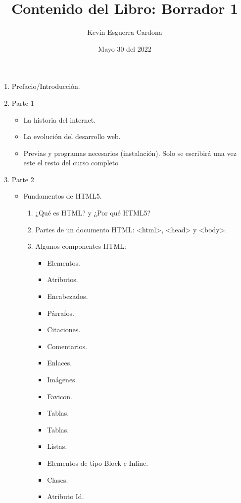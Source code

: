 \documentclass[12pt, letterpaper]{article}
\title{Contenido del Libro: Borrador 1}
\author{Kevin  Esguerra Cardona}
\date{Mayo 30 del 2022}
\begin{document}
\maketitle

\begin{enumerate}
    \item Prefacio/Introducción.
    \item Parte 1
    \begin{itemize}
        \item La historia del internet.
        \item La evolución del desarrollo web.
        \item Previas y programas necesarios (instalación). \newline*Solo se escribirá  una vez este el resto del curso completo
    \end{itemize}
    \item Parte 2
    \begin{itemize}
        \item Fundamentos de HTML5.
        \begin{enumerate}
            \item ¿Qué es HTML? y ¿Por qué HTML5?
            \item Partes de un documento HTML: <html>, <head> y <body>.
            \item Algunos componentes HTML:
            \begin{itemize}
                \item Elementos.
                \item Atributos.
                \item Encabezados.
                \item Párrafos.
                \item Citaciones.
                \item Comentarios.
                \item Enlaces.
                \item Imágenes.
                \item Favicon.
                \item Tablas.
                \item Tablas.
                \item Listas.
                \item Elementos de tipo Block e Inline.
                \item Clases.
                \item Atributo Id.

\end{itemize}
\end{enumerate}
\end{itemize}
\end{enumerate}
\end{document}
